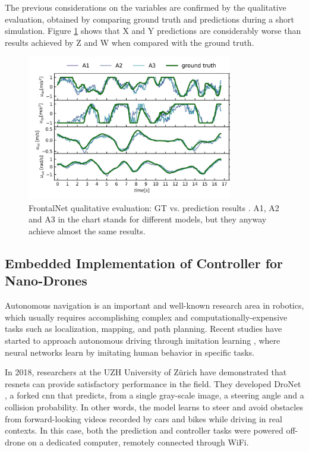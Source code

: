 \medskip

The previous considerations on the variables are confirmed by the qualitative evaluation, obtained by comparing ground truth and predictions during a short simulation. Figure \ref{fig:frontalnet-gt-pred} shows that X and Y predictions are considerably worse than results achieved by Z and W when compared with the ground truth.

\begin{figure}[!htb]
	\centering
	\includegraphics[width=0.8\textwidth]{"contents/images/03-frontalnet-gt-pred-2"}
	\caption[FrontalNet qualitative evaluation: GT vs. prediction results \cite{mantegazza2019visionbased}]{FrontalNet qualitative evaluation: GT vs. prediction results \cite{mantegazza2019visionbased}. A1, A2 and A3 in the chart stands for different models, but they anyway achieve almost the same results.}
	\label{fig:frontalnet-gt-pred}
\end{figure}


\subsection{Embedded Implementation of Controller for Nano-Drones}
\label{subsec:sota-nicky}

Autonomous navigation is an important and well-known research area in robotics, which usually requires accomplishing complex and computationally-expensive tasks such as localization, mapping, and path planning. Recent studies have started to approach autonomous driving through imitation learning \cite{imitation_learning_survey}, where neural networks learn by imitating human behavior in specific tasks. 

\medskip

In 2018, researchers at the UZH University of Zürich have demonstrated that \gls{resnet}s can provide satisfactory performance in the field. They developed DroNet \cite{Loquercio_2018}, a forked \gls{cnn} that predicts, from a single gray-scale image, a steering angle and a collision probability. In other words, the model learns to steer and avoid obstacles from forward-looking videos recorded by cars and bikes while driving in real contexts. In this case, both the prediction and controller tasks were powered off-drone on a dedicated computer, remotely connected through WiFi. 

